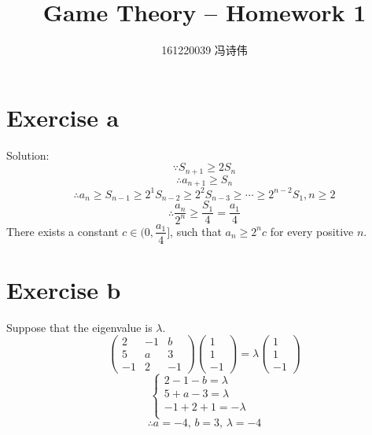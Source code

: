 \documentclass[a4papers]{ctexart}
\title{Game Theory -- Homework 1}
\author{161220039 冯诗伟 }
\date{}
\begin{document}
\maketitle
\section*{Exercise a}
\noindent Solution:
\[\because S_{n+1}\ge 2S_n \]\[\therefore a_{n+1}\ge S_n\]
\[\therefore a_n \ge S_{n-1} \ge 2^1 S_{n-2} \ge 2^2 S_{n-3} \ge \cdots \ge 2^{n-2}S_1 , n\ge 2\]
\[ \therefore \dfrac{a_n}{2^n} \ge \dfrac{S_1}{4} = \dfrac{a_1}{4}\]
There exists a constant $c \in (0,\dfrac{a_1}{4}]$, such that $a_n \ge 2^n c$ for every positive $n$.

\section*{Exercise b}
\noindent Suppose that the eigenvalue is $\lambda$.
\[ \begin{pmatrix}
2 &  -1 & b \\5 &  a &  3\\ -1 &  2 &  -1
\end{pmatrix}
\begin{pmatrix}
1 \\  1 \\ -1
\end{pmatrix}
= \lambda \begin{pmatrix}
1 \\  1 \\ -1
\end{pmatrix}
\]
\begin{equation*}
    \begin{cases}
        2-1-b=\lambda & \\
        5+a-3=\lambda & \\
        -1+2+1=-\lambda & \\
    \end{cases}
\end{equation*}
\[\therefore a=-4,\,b=3,\,\lambda=-4\]
\end{document}
